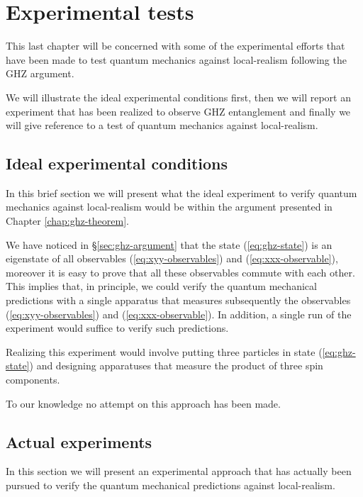 \chapter{Experimental tests}
\label{chap:ghz-experiments}
This last chapter will be concerned with some of the experimental efforts that have been made to test quantum mechanics against local-realism following the GHZ argument.

We will illustrate the ideal experimental conditions first, then we will report an experiment that has been realized to observe GHZ entanglement and finally we will give reference to a test of quantum mechanics against local-realism.

\section{Ideal experimental conditions}
In this brief section we will present what the ideal experiment to verify quantum mechanics against local-realism would be within the argument presented in Chapter \ref{chap:ghz-theorem}.%

We have noticed in \S \ref{sec:ghz-argument} that the state (\ref{eq:ghz-state}) is an eigenstate of all observables (\ref{eq:xyy-observables}) and (\ref{eq:xxx-observable}), moreover it is easy to prove that all these observables commute with each other. This implies that, in principle, we could verify the quantum mechanical predictions with a single apparatus that measures subsequently the observables (\ref{eq:xyy-observables}) and (\ref{eq:xxx-observable}). In addition, a single run of the experiment would suffice to verify such predictions.

Realizing this experiment would involve putting three particles in state (\ref{eq:ghz-state}) and designing apparatuses that measure the product of three spin components.%

To our knowledge no attempt on this approach has been made. 


\section{Actual experiments}
In this section we will present an experimental approach that has actually been pursued to verify the quantum mechanical predictions against local-realism.

